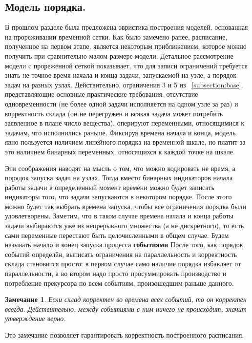 \documentclass[12pt, twoside]{article}
\newtheorem*{remark}{Замечание}
\theoremstyle{definition}
\begin{document}
\subsection{Модель порядка.}

В прошлом разделе была предложена эвристика построения моделей, основанная на прореживании временной сетки. Как было замечено ранее, расписание, полученное на первом этапе, является некоторым приближением, которое можно получить при сравнительно малом размере модели. Детальное рассмотрение модели с прореженной сеткой показывает, что для записи ограничений требуется знать не точное время начала и конца задачи, запускаемой на узле, а порядок задач на разных узлах. Действительно, ограничения 3 и 5 из ~\ref{subsection:base}, представляющие основные практические требования: отсутствие одновременности (не более одной задачи исполняется на одном узле за раз) и корректность склада (он не перегружен и всякая задача может потребить заявленное в плане число вещества), оперируют переменными, относящимися к задачам, что исполнились раньше. Фиксируя времена начала и конца, модель явно пользуется наличием линейного порядка на временной шкале, но платит за это наличием бинарных переменных, относящихся к каждой точке на шкале.

Эти соображения наводят на мысль о том, что можно кодировать не время, а порядок запуска задач на узлах. Тогда вместо бинарных индикаторов начала работы задачи в определенный момент времени можно будет записать индикаторы того, что задачи запускаются в некотором порядке. После этого можно будет так выбрать времена запуска, чтобы все ограничения порядка были удовлетворены. Заметим, что в таком случае времена начала и конца работы задачи выбираются уже из непрерывного множества (а не дискретного), то есть сами переменные перестают быть целочисленными в общем случае. Будем называть начало и конец запуска процесса \textbf{событиями} После того, как порядок событий определён, выписать ограничения на параллельность и корректность склада становится просто: в первом случае само наличие порядка избавляет от параллельности, а во втором надо просто просуммировать производство и потребление прекурсора по всем событиям, произошедшим раньше данного.

\begin{remark}
Если склад корректен во времена всех событий, то он корректен всегда. Действительно, между событиями с ним ничего не происходит, значит утверждение верно.
\end{remark}

Это замечание позволяет гарантировать корректность построенного расписания.
\end{document}
